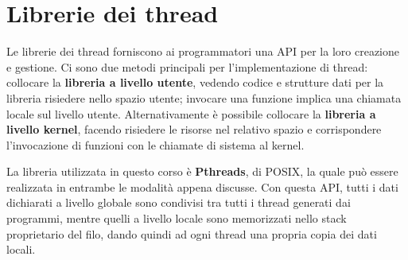 %

\section{Librerie dei thread}
Le librerie dei thread forniscono ai programmatori una API per la loro creazione e gestione. Ci sono due metodi principali per l'implementazione di
thread: collocare la \textbf{libreria a livello utente}, vedendo codice e strutture dati per la libreria risiedere nello spazio utente; invocare una
funzione implica una chiamata locale sul livello utente. Alternativamente è possibile collocare la \textbf{libreria a livello kernel}, facendo risiedere
le risorse nel relativo spazio e corrispondere l'invocazione di funzioni con le chiamate di sistema al kernel.\par
La libreria utilizzata in questo corso è \textbf{Pthreads}, di POSIX, la quale può essere realizzata in entrambe le modalità appena discusse. Con questa
API, tutti i dati dichiarati a livello globale sono condivisi tra tutti i thread generati dai programmi, mentre quelli a livello locale sono memorizzati
nello stack proprietario del filo, dando quindi ad ogni thread una propria copia dei dati locali.\newline

